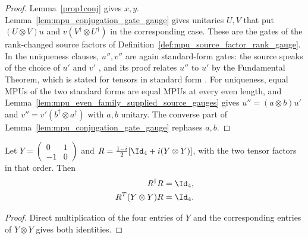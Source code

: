 \begin{proof}
    \leanok
    Lemma~\ref{prop1conj} gives $x,y$. Lemma~\ref{lem:mpu_conjugation_gate_gauge}
    gives unitaries $U,V$ that put $(U\otimes V)u$ and
    $v(V^\dagger\otimes U^\dagger)$ in the corresponding case. These are the
    gates of the rank-changed source factors of
    Definition~\ref{def:mpu_source_factor_rank_gauge}. In the uniqueness
    clauses, $u'',v''$ are again standard-form gates: the source speaks of the
    choice of $u'$ and $v'$ \cite[lines~1100--1104]{Cirac2017MPU}, and its proof
    relates $u''$ to $u'$ by the Fundamental Theorem, which is stated for
    tensors in standard form \cite[lines~1151--1153]{Cirac2017MPU}. For
    uniqueness, equal
    MPUs of the two standard forms are equal MPUs at every even length, and
    Lemma~\ref{lem:mpu_even_family_supplied_source_gauges} gives
    $u''=(a\otimes b)u'$ and $v''=v'(b^\dagger\otimes a^\dagger)$ with $a,b$
    unitary. The converse part of Lemma~\ref{lem:mpu_conjugation_gate_gauge}
    rephases $a,b$.
\end{proof}

\begin{lemma}
    \label{lem:mpu_symplectic_four_congruence}
    \leanok
    Let $Y=\begin{pmatrix}0&1\\-1&0\end{pmatrix}$ and
    $R=\frac{1-i}{2}[\Id_4+i(Y\otimes Y)]$, with the two tensor factors in
    that order. Then
    \begin{align}
        R^\dagger R      & =\Id_4, \\
        R^T(Y\otimes Y)R & =\Id_4.
    \end{align}
\end{lemma}

\begin{proof}
    \leanok
    Direct multiplication of the four entries of $Y$ and the corresponding
    entries of $Y\otimes Y$ gives both identities.
\end{proof}

